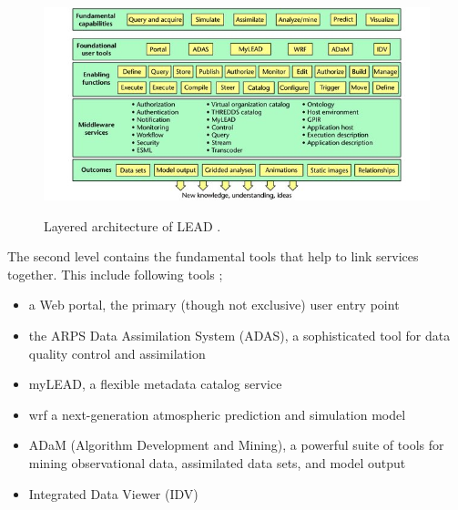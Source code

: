 \begin{figure}[htp]
    \centering
    \includegraphics[width=1.0\textwidth]{lead/LEAD-system-Fundamental-capabilities-familiar-to-meteorologists-are-shown-in-the-top_W640.jpg}\\
    \caption[Layered architecture of LEAD]{Layered architecture of LEAD \cite{Droegemeier2005Service-OrientedWeather}.}
    \label{fi:lead_system}
\end{figure}


The second level contains the fundamental tools that help to link services together. This include following tools \cite{Droegemeier2005Service-OrientedWeather};
\begin{itemize}
    \item a Web portal, the primary (though not exclusive) user entry point
    \item the ARPS Data Assimilation System (ADAS), a sophisticated tool for data quality control and assimilation
    \item myLEAD, a flexible metadata catalog service
    \item \acrfull{wrf} a next-generation atmospheric prediction and simulation model
    \item ADaM (Algorithm Development and Mining), a powerful suite of tools for mining observational data, assimilated data sets, and model output 
    \item Integrated Data Viewer (IDV) 
\end{itemize}

